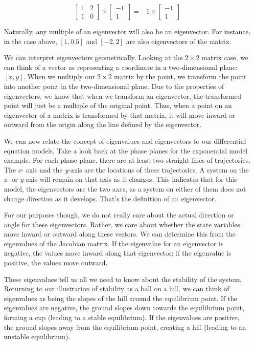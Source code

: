 \documentclass[]{memoir}
\begin{document}
\[\begin{bmatrix} 1 & 2 \\ 1 & 0 \end{bmatrix} \times \begin{bmatrix} -1 \\ 1 \end{bmatrix} = -1 \times \begin{bmatrix} -1 \\ 1 \end{bmatrix}\]

Naturally, any multiple of an eigenvector will also be an eigenvector.
For instance, in the case above, $[1, 0.5]$ and $[-2, 2]$ are also
eigenvectors of the matrix.

We can interpret eigenvectors geometrically. Looking at the $2\times2$
matrix case, we can think of a vector as representing a coordinate in a
two-dimensional plane: $[x,y]$. When we multiply our $2\times2$ matrix
by the point, we transform the point into another point in the
two-dimensional plane. Due to the properties of eigenvectors, we know
that when we transform an eigenvector, the transformed point will just
be a multiple of the original point. Thus, when a point on an
eigenvector of a matrix is transformed by that matrix, it will move
inward or outward from the origin along the line defined by the
eigenvector.

We can now relate the concept of eigenvalues and eigenvectors to our
differential equation models. Take a look back at the phase planes for
the exponential model example. For each phase plane, there are at least
two straight lines of trajectories. The \emph{x}- axis and the
\emph{y}-axis are the locations of these trajectories. A system on the
\emph{x}- or \emph{y}-axis will remain on that axis as it changes. This
indicates that for this model, the eigenvectors are the two axes, as a
system on either of them does not change direction as it develops.
That's the definition of an eigenvector.

For our purposes though, we do not really care about the actual
direction or angle for these eigenvectors. Rather, we care about whether
the state variables move inward or outward along these vectors. We can
determine this from the eigenvalues of the Jacobian matrix. If the
eigenvalue for an eigenvector is negative, the values move inward along
that eigenvector; if the eigenvalue is positive, the values move
outward.

These eigenvalues tell us all we need to know about the stability of the
system. Returning to our illustration of stability as a ball on a hill,
we can think of eigenvalues as being the slopes of the hill around the
equilibrium point. If the eigenvalues are negative, the ground slopes
down towards the equilibrium point, forming a cup (leading to a stable
equilibrium). If the eigenvalues are positive, the ground slopes away
from the equilibrium point, creating a hill (leading to an unstable
equilibrium).
\end{document}
